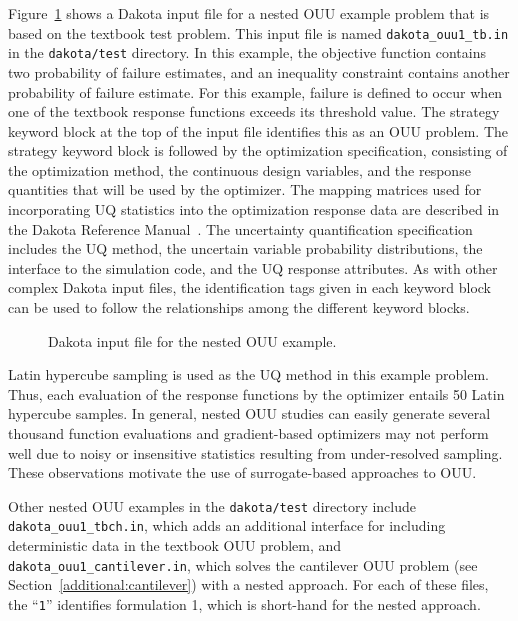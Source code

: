Figure~\ref{adv_models:figure09} shows a Dakota input file for a nested
OUU example problem that is based on the textbook test problem. This
input file is named \texttt{dakota\_ouu1\_tb.in} in the
\texttt{dakota/test} directory.  In this example, the objective
function contains two probability of failure estimates, and an
inequality constraint contains another probability of failure
estimate. For this example, failure is defined to occur when one of
the textbook response functions exceeds its threshold value. The
strategy keyword block at the top of the input file identifies this as
an OUU problem. The strategy keyword block is followed by the
optimization specification, consisting of the optimization method, the
continuous design variables, and the response quantities that will be
used by the optimizer. The mapping matrices used for incorporating UQ
statistics into the optimization response data are described in the
Dakota Reference Manual~\cite{RefMan}. The uncertainty quantification
specification includes the UQ method, the uncertain variable
probability distributions, the interface to the simulation code, and
the UQ response attributes. As with other complex Dakota input files,
the identification tags given in each keyword block can be used to
follow the relationships among the different keyword blocks.

\begin{figure}
  \centering
  \begin{bigbox}
    \begin{tiny}
    \end{tiny}
  \end{bigbox}
  \caption{Dakota input file for the nested OUU example.}
  \label{adv_models:figure09}
\end{figure}

Latin hypercube sampling is used as the UQ method in this example
problem. Thus, each evaluation of the response functions by the
optimizer entails 50 Latin hypercube samples. In general, nested OUU
studies can easily generate several thousand function evaluations and
gradient-based optimizers may not perform well due to noisy or
insensitive statistics resulting from under-resolved sampling. These
observations motivate the use of surrogate-based approaches to OUU.

Other nested OUU examples in the \texttt{dakota/test} directory
include \texttt{dakota\_ouu1\_tbch.in}, which adds an additional
interface for including deterministic data in the textbook OUU
problem, and\\ \texttt{dakota\_ouu1\_cantilever.in}, which solves the
cantilever OUU problem (see Section~\ref{additional:cantilever}) with
a nested approach. For each of these files, the ``\texttt{1}''
identifies formulation 1, which is short-hand for the nested approach.


